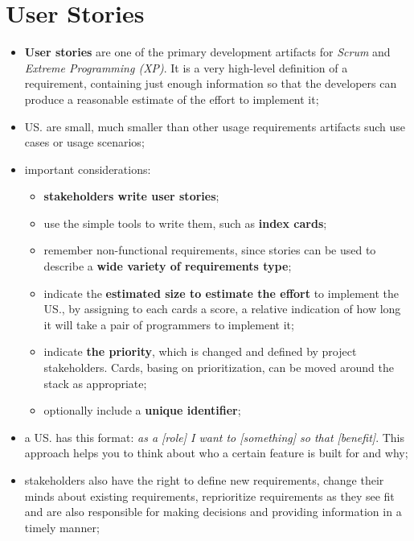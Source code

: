 \documentclass[oneside]{article}
\begin{document}


\newpage
\section{User Stories}
\begin{itemize}
    \item \textbf{User stories} are one of the primary development artifacts for \textit{Scrum} and \textit{Extreme Programming (XP)}. It is a very high-level definition of a requirement, containing just enough information so that the developers can produce a reasonable estimate of the effort to implement it;
    
    \item US. are small, much smaller than other usage requirements artifacts such use cases or usage scenarios;
    
    \item important considerations:
        \begin{itemize}
            \item \textbf{stakeholders write user stories};
            \item use the simple tools to write them, such as \textbf{index cards};
            \item remember non-functional requirements, since stories can be used to describe a\textbf{ wide variety of requirements type};
            \item indicate the \textbf{estimated size to estimate the effort} to implement the US., by assigning to each cards a score, a relative indication of how long it will take a pair of programmers to implement it;
            \item indicate \textbf{the priority}, which is changed and defined by project stakeholders. Cards, basing on prioritization, can be moved around the stack as appropriate;
            \item optionally include a \textbf{unique identifier};
        \end{itemize}

    \item a US. has this format: \textit{as a [role] I want to [something] so that [benefit]}. This approach helps you to think about who a certain feature is built for and why;
    
    \item stakeholders also have the right to define new requirements, change their minds about existing requirements, reprioritize requirements as they see fit and are also responsible for making decisions and providing information in a timely manner;
    

\end{itemize}
\end{document}
